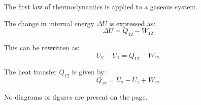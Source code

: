 The first law of thermodynamics is applied to a gaseous system.  

The change in internal energy \( \Delta U \) is expressed as:  
\[
\Delta U = Q_{12} - W_{12}
\]  

This can be rewritten as:  
\[
U_2 - U_1 = Q_{12} - W_{12}
\]  

The heat transfer \( Q_{12} \) is given by:  
\[
Q_{12} = U_2 - U_1 + W_{12}
\]  

No diagrams or figures are present on the page.